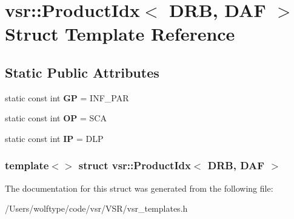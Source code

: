 \hypertarget{structvsr_1_1_product_idx_3_01_d_r_b_00_01_d_a_f_01_4}{\section{vsr\-:\-:Product\-Idx$<$ D\-R\-B, D\-A\-F $>$ Struct Template Reference}
\label{structvsr_1_1_product_idx_3_01_d_r_b_00_01_d_a_f_01_4}
}
\subsection*{Static Public Attributes}
\begin{DoxyCompactItemize}
\item 
\hypertarget{structvsr_1_1_product_idx_3_01_d_r_b_00_01_d_a_f_01_4_a83f08bbc71b0a1d54107df16261a49df}{static const int {\bfseries G\-P} = I\-N\-F\-\_\-\-P\-A\-R}\label{structvsr_1_1_product_idx_3_01_d_r_b_00_01_d_a_f_01_4_a83f08bbc71b0a1d54107df16261a49df}

\item 
\hypertarget{structvsr_1_1_product_idx_3_01_d_r_b_00_01_d_a_f_01_4_af658fd0cde5588bd6e341a934e458630}{static const int {\bfseries O\-P} = S\-C\-A}\label{structvsr_1_1_product_idx_3_01_d_r_b_00_01_d_a_f_01_4_af658fd0cde5588bd6e341a934e458630}

\item 
\hypertarget{structvsr_1_1_product_idx_3_01_d_r_b_00_01_d_a_f_01_4_a399523ffd3cbbe5a71ba9a2580bd7326}{static const int {\bfseries I\-P} = D\-L\-P}\label{structvsr_1_1_product_idx_3_01_d_r_b_00_01_d_a_f_01_4_a399523ffd3cbbe5a71ba9a2580bd7326}

\end{DoxyCompactItemize}
\subsubsection*{template$<$$>$ struct vsr\-::\-Product\-Idx$<$ D\-R\-B, D\-A\-F $>$}



The documentation for this struct was generated from the following file\-:\begin{DoxyCompactItemize}
\item 
/\-Users/wolftype/code/vsr/\-V\-S\-R/vsr\-\_\-templates.\-h\end{DoxyCompactItemize}
